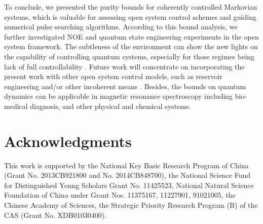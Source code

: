 \documentclass[prl,aps,twocolumn, reprint, amsmath,amssymb,showpacs,superscriptaddress]{revtex4}
\begin{document}
To conclude, we presented the purity bounds for coherently controlled Markovian systems, which is valuable for assessing open system control schemes and guiding numerical pulse searching algorithms. According to this bound analysis, we further investigated NOE and quantum state engineering experiments in the open system framework. The subtleness of the environment can show the new lights on the capability of controlling quantum systems, especially for those regimes being lack of full controllability \cite{XYS, L}. Future work will concentrate on incorporating the present work with other open system control models, such as reservoir engineering and/or other incoherent means \cite{PR}. Besides, the bounds on quantum dynamics can be applicable in magnetic resonance spectroscopy including bio-medical diagnosis, and other physical and chemical systems.


\section{Acknowledgments}
This work is supported by the National Key Basic Research Program of China (Grant No. 2013CB921800 and No. 2014CB848700), the National
Science Fund for Distinguished Young Scholars Grant No. 11425523, National Natural Science Foundation of China under Grant Nos. 11375167, 11227901, 91021005, the Chinese Academy of Sciences, the Strategic Priority Research Program (B) of the CAS (Grant No. XDB01030400).
\end{document}
